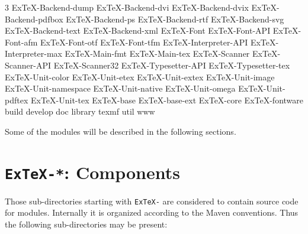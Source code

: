 {
\begin{multicols}3 \footnotesize\sf\obeylines
  ExTeX-Backend-dump
  ExTeX-Backend-dvi
  ExTeX-Backend-dvix
  ExTeX-Backend-pdfbox
  ExTeX-Backend-ps
  ExTeX-Backend-rtf
  ExTeX-Backend-svg
  ExTeX-Backend-text
  ExTeX-Backend-xml
  ExTeX-Font
  ExTeX-Font-API
  ExTeX-Font-afm
  ExTeX-Font-otf
  ExTeX-Font-tfm
  ExTeX-Interpreter-API
  ExTeX-Interpreter-max
  ExTeX-Main-fmt
  ExTeX-Main-tex
  ExTeX-Scanner
  ExTeX-Scanner-API
  ExTeX-Scanner32
  ExTeX-Typesetter-API
  ExTeX-Typesetter-tex
  ExTeX-Unit-color
  ExTeX-Unit-etex
  ExTeX-Unit-extex
  ExTeX-Unit-image
  ExTeX-Unit-namespace
  ExTeX-Unit-native
  ExTeX-Unit-omega
  ExTeX-Unit-pdftex
  ExTeX-Unit-tex
  ExTeX-base
  ExTeX-base-ext
  ExTeX-core
  ExTeX-fontware
  build
  develop
  doc
  library
  texmf
  util
  www
\end{multicols}
}


Some of the modules will be described in the following sections.


\section{\texttt{ExTeX-*}: Components}

Those sub-directories starting with \texttt{ExTeX-} are considered to
contain source code for modules. Internally it is organized according
to the Maven conventions. Thus the following sub-directories may be
present:


